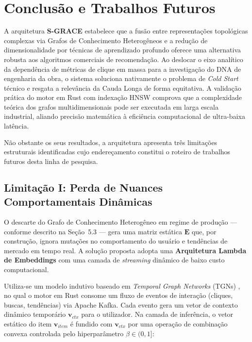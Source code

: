 \documentclass[11pt,a4paper]{article}
\begin{document}

\section{Conclusão e Trabalhos Futuros}

A arquitetura \textbf{S-GRACE} estabelece que a fusão entre representações topológicas complexas
via Grafos de Conhecimento Heterogêneos e a redução de dimensionalidade por técnicas de aprendizado
profundo oferece uma alternativa robusta aos algoritmos comerciais de recomendação. Ao deslocar o
eixo analítico da dependência de métricas de clique em massa para a investigação do DNA de
engenharia da obra, o sistema soluciona nativamente o problema de \textit{Cold Start} técnico e
resgata a relevância da Cauda Longa de forma equitativa. A validação prática do motor em Rust com
indexação HNSW comprova que a complexidade teórica dos grafos multidimensionais pode ser executada
em larga escala industrial, aliando precisão matemática à eficiência computacional de ultra-baixa
latência.

Não obstante os seus resultados, a arquitetura apresenta três limitações estruturais identificadas
cujo endereçamento constitui o roteiro de trabalhos futuros desta linha de pesquisa.

\subsection{Limitação I: Perda de Nuances Comportamentais Dinâmicas}

O descarte do Grafo de Conhecimento Heterogêneo em regime de produção — conforme descrito na
Seção~5.3 — gera uma matriz estática $\mathbf{E}$ que, por construção, ignora mutações no
comportamento do usuário e tendências de mercado em tempo real. A solução proposta adopta uma
\textbf{Arquitetura Lambda de Embeddings} com uma camada de \textit{streaming} dinâmico de baixo
custo computacional.

Utiliza-se um modelo indutivo baseado em \textit{Temporal Graph Networks} (TGNs)
\cite{tgn}, no qual o motor em Rust consome um fluxo de eventos de interação (cliques,
buscas, tendências) via Apache Kafka. Cada evento gera um vetor de contexto dinâmico temporário
$\mathbf{v}_{ctx}$ para o utilizador. Na camada de inferência, o vetor estático do item
$\mathbf{v}_{item}$ é fundido com $\mathbf{v}_{ctx}$ por uma operação de combinação convexa
controlada pelo hiperparâmetro $\beta \in (0, 1]$:
\end{document}
